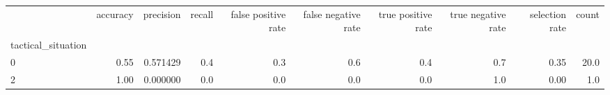 \begin{tabular}{lrrrrrrrrr}
\toprule
{} &  accuracy &  precision &  recall &  false positive rate &  false negative rate &  true positive rate &  true negative rate &  selection rate &  count \\
tactical\_situation &           &            &         &                      &                      &                     &                     &                 &        \\
\midrule
0                  &      0.55 &   0.571429 &     0.4 &                  0.3 &                  0.6 &                 0.4 &                 0.7 &            0.35 &   20.0 \\
2                  &      1.00 &   0.000000 &     0.0 &                  0.0 &                  0.0 &                 0.0 &                 1.0 &            0.00 &    1.0 \\
\bottomrule
\end{tabular}
